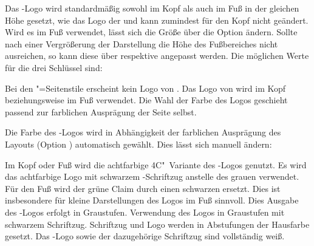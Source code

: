 \begin{DeclareEntity*}{}
\begin{DeclareEntity*}{}
\begin{DeclareEntity*}{}
\begin{Declaration}
\begin{Declaration}
\begin{Declaration}
Das \DDC-Logo wird standardmäßig sowohl im Kopf als auch im Fuß in der gleichen 
Höhe gesetzt, wie das Logo der \TnUD und kann zumindest für den Kopf nicht 
geändert. Wird es im Fuß verwendet, lässt sich die Größe über die Option 
 ändern. Sollte nach einer Vergrößerung der Darstellung 
die Höhe des Fußbereiches nicht ausreichen, so kann diese über 
 respektive 
 angepasst werden.
Die möglichen Werte für die drei Schlüssel sind:
\begin{DeclareValues}{}
  Bei den "=Seitenstile erscheint kein Logo von \DDC.
  Das Logo von \DDC wird im Kopf beziehungsweise im Fuß verwendet. Die Wahl der 
  Farbe des Logos geschieht passend zur farblichen Ausprägung der Seite selbst.
\end{DeclareValues}

Die Farbe des \DDC-Logos wird in Abhängigkeit der farblichen Ausprägung des 
Layouts (Option ) automatisch gewählt. Dies lässt sich 
manuell ändern:
\begin{DeclareValues}{}
  Im Kopf oder Fuß wird die achtfarbige 4C"~Variante des \DDC-Logos genutzt.
  Es wird das achtfarbige Logo mit schwarzem \DDC-Schriftzug anstelle des 
  grauen verwendet. Für den Fuß wird der grüne Claim durch einen schwarzen 
  ersetzt. Dies ist insbesondere für kleine Darstellungen des Logos im Fuß 
  sinnvoll.
  Dies Ausgabe des \DDC-Logos erfolgt in Graustufen.
  Verwendung des Logos in Graustufen mit schwarzem Schriftzug.
  Schriftzug und Logo werden in Abstufungen der Hausfarbe  gesetzt.
  Das \DDC-Logo sowie der dazugehörige Schriftzug sind vollständig weiß.
\end{DeclareValues}
\end{Declaration}
\end{Declaration}
\end{Declaration}


\end{DeclareEntity*}
\end{DeclareEntity*}
\end{DeclareEntity*}
